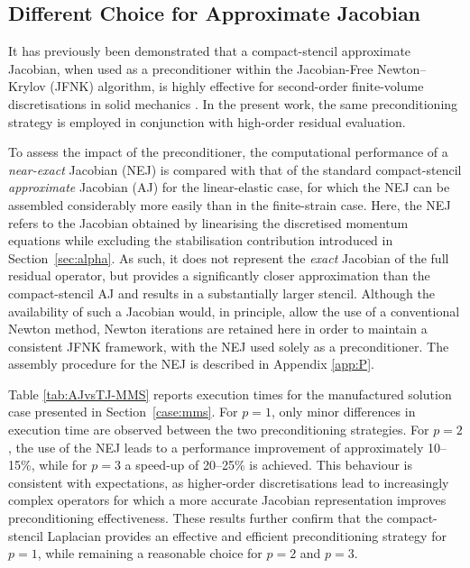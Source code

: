 \documentclass[sn-mathphys,Numbered]{sn-jnl}%
\begin{document}
\subsection{Different Choice for Approximate Jacobian}
%
It has previously been demonstrated that a compact-stencil approximate Jacobian, when used as a preconditioner within the Jacobian-Free Newton–Krylov (JFNK) algorithm, is highly effective for second-order finite-volume discretisations in solid mechanics \cite{Cardiff2025}. In the present work, the same preconditioning strategy is employed in conjunction with high-order residual evaluation.

To assess the impact of the preconditioner, the computational performance of a \emph{near-exact} Jacobian (NEJ) is compared with that of the standard compact-stencil \emph{approximate} Jacobian (AJ) for the linear-elastic case, for which the NEJ can be assembled considerably more easily than in the finite-strain case.
Here, the NEJ refers to the Jacobian obtained by linearising the discretised momentum equations while excluding the stabilisation contribution
introduced in Section~\ref{sec:alpha}. As such, it does not represent the \emph{exact} Jacobian of the full residual operator, but provides a significantly closer approximation than the compact-stencil AJ and results in a substantially larger stencil.
Although the availability of such a Jacobian would, in
principle, allow the use of a conventional Newton method, Newton iterations are retained here in
order to maintain a consistent JFNK framework, with the NEJ used solely as a preconditioner. The
assembly procedure for the NEJ is described in Appendix \ref{app:P}.

Table \ref{tab:AJvsTJ-MMS} reports execution times for the manufactured solution case presented in Section~\ref{case:mms}.
For $p=1$, only minor differences in execution time are observed between the two preconditioning strategies. 
For $p=2$, the use of the NEJ leads to a performance improvement of approximately 10–15\%, while for $p=3$ a speed-up of 20–25\% is achieved. 
This behaviour is consistent with expectations, as higher-order discretisations lead to increasingly complex operators for which a more accurate Jacobian representation improves preconditioning effectiveness. These results further confirm that the compact-stencil Laplacian provides an effective and efficient preconditioning strategy for $p=1$, while remaining a reasonable choice for $p=2$ and $p=3$.
\end{document}

